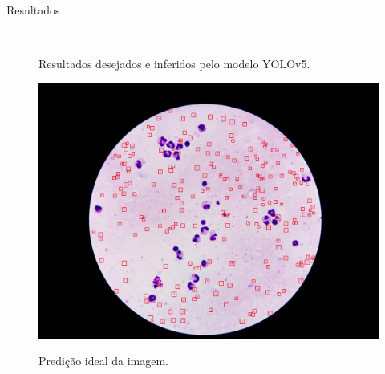 \begin{frame}{Resultados}
    \begin{figure}[H]
	\centering
	 \\
	\caption{Resultados desejados e inferidos pelo modelo YOLOv5.} \label{img:yolov5}
\end{figure}
\end{frame}

\begin{frame}
    \begin{figure}[H]
	\centering
    \includegraphics[width=0.73\linewidth]{./img/results/result5-v7-ideal.jpg} \\
	\caption{Predição ideal da imagem.} \label{img:yolov7-ideal}
\end{figure}
\end{frame}

